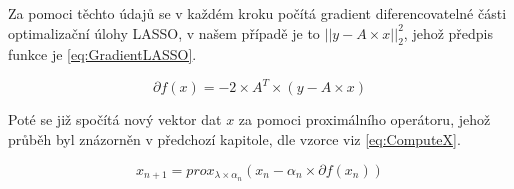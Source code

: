 \documentclass[FM,BP]{tulthesis}
\newcounter{Vzorce}
\begin{document}
Za pomoci těchto údajů se v každém kroku počítá gradient diferencovatelné části optimalizační úlohy LASSO, v našem případě je to $\left|\right|y-A \times x\left|\right|_{2}^{2}$, jehož předpis funkce je \ref{eq:GradientLASSO}.

\begin{equation} \label{eq:GradientLASSO}  \tag{Vzorec \theVzorce}
\partial f(x) = -2 \times A^T \times (y-A \times x)
\end{equation}

Poté se již spočítá nový vektor dat $x$ za pomoci proximálního operátoru, jehož průběh byl znázorněn v předchozí kapitole, dle vzorce viz \ref{eq:ComputeX}. 

\begin{equation} \label{eq:ComputeX}  \tag{Vzorec \theVzorce}
x_{n+1} = prox_{\lambda \times \alpha _{n}}(x_{n}- \alpha _{n} \times \partial f(x_{n}))
\end{equation}
\end{document}
